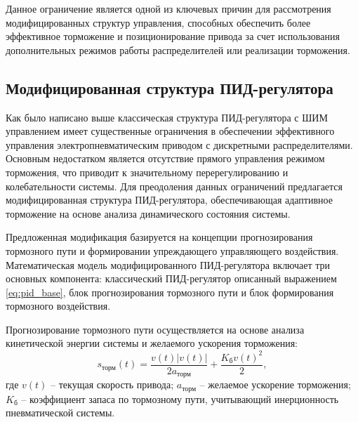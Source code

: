 Данное ограничение является одной из ключевых причин для рассмотрения модифицированных
структур управления, способных обеспечить более эффективное торможение и позиционирование
привода за счет использования дополнительных режимов работы распределителей или реализации
торможения.

\subsection{Модифицированная структура ПИД-регулятора}\label{subsec:ch3/sec2/sub3}

Как было написано выше классическая структура ПИД-регулятора с ШИМ управлением имеет существенные ограничения
в обеспечении эффективного управления электропневматическим приводом с дискретными распределителями.
Основным недостатком является отсутствие прямого управления режимом торможения, что приводит к значительному
перерегулированию и колебательности системы. Для преодоления данных ограничений предлагается модифицированная
структура ПИД-регулятора, обеспечивающая адаптивное торможение на основе анализа динамического состояния системы.

Предложенная модификация базируется на концепции прогнозирования тормозного пути и формировании упреждающего
управляющего воздействия. Математическая модель модифицированного ПИД-регулятора включает три основных
компонента: классический ПИД-регулятор описанный выражением \ref{eq:pid_base}, блок прогнозирования тормозного пути
и блок формирования тормозного воздействия.

Прогнозирование тормозного пути осуществляется на основе анализа
кинетической энергии системы и желаемого ускорения торможения:
\begin{equation*}\label{eq:braking_prediction}
	s_{\text{торм}}(t) = \frac{v(t)|v(t)|}{2a_{\text{торм}}} + \frac{K_{\text{б}}v(t)^2}{2},
\end{equation*}
где $v(t)$ -- текущая скорость привода;
$a_{\text{торм}}$ -- желаемое ускорение торможения;
$K_{\text{б}}$ -- коэффициент запаса по тормозному пути, учитывающий инерционность пневматической системы.

